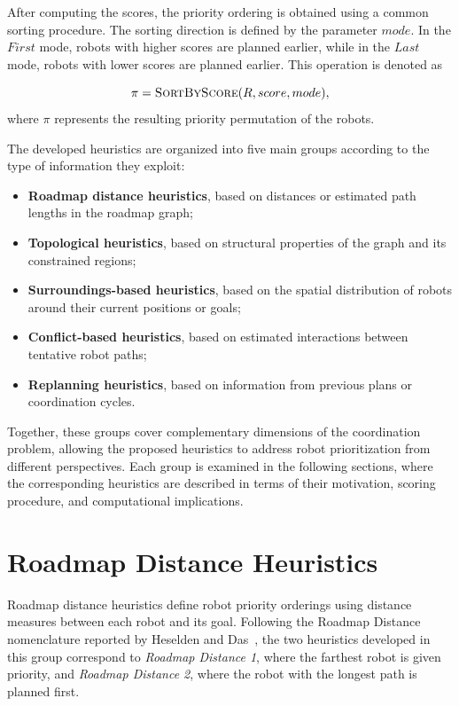After computing the scores, the priority ordering is obtained using a common sorting procedure. The sorting direction is defined by the parameter \(mode\). In the \(\textit{First}\) mode, robots with higher scores are planned earlier, while in the \(\textit{Last}\) mode, robots with lower scores are planned earlier. This operation is denoted as

\begin{equation}
    \pi = \textsc{SortByScore}(R, score, mode),
\end{equation}
where \(\pi\) represents the resulting priority permutation of the robots.

The developed heuristics are organized into five main groups according to the type of information they exploit:

\begin{itemize}
    \item \textbf{Roadmap distance heuristics}, based on distances or estimated path lengths in the roadmap graph;

    \item \textbf{Topological heuristics}, based on structural properties of the graph and its constrained regions;

    \item \textbf{Surroundings-based heuristics}, based on the spatial distribution of robots around their current positions or goals;

    \item \textbf{Conflict-based heuristics}, based on estimated interactions between tentative robot paths;

    \item \textbf{Replanning heuristics}, based on information from previous plans or coordination cycles.
\end{itemize}

Together, these groups cover complementary dimensions of the coordination problem, allowing the proposed heuristics to address robot prioritization from different perspectives. Each group is examined in the following sections, where the corresponding heuristics are described in terms of their motivation, scoring procedure, and computational implications.

\section{Roadmap Distance Heuristics}
\label{sec:roadmap_distance_heuristics}
\hspace{\parindent}
Roadmap distance heuristics define robot priority orderings using distance measures between each
robot and its goal. Following the Roadmap Distance nomenclature reported by Heselden and
Das~\cite{machines2023survey}, the two heuristics developed in this group correspond to
\emph{Roadmap Distance 1}, where the farthest robot is given priority, and
\emph{Roadmap Distance 2}, where the robot with the longest path is planned first.


